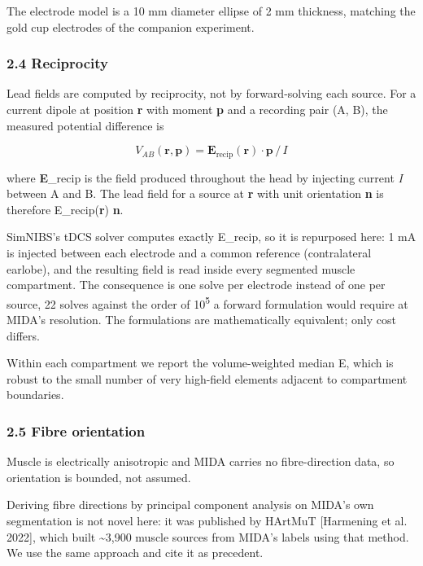 \documentclass[
  11pt,
  a4paper,
]{article}
\begin{document}
The electrode model is a 10 mm diameter ellipse of 2 mm thickness, matching the
gold cup electrodes of the companion experiment.

\subsubsection{2.4 Reciprocity}\label{reciprocity}

Lead fields are computed by reciprocity, not by forward-solving each source. For
a current dipole at position \textbf{r} with moment \textbf{p} and a recording pair (A,
B), the measured potential difference is

\[V_{AB}(\mathbf{r}, \mathbf{p}) = \mathbf{E}_{\mathrm{recip}}(\mathbf{r}) \cdot \mathbf{p} \, / \, I\]

where \textbf{E}\_recip is the field produced throughout the head by injecting current
\emph{I} between A and B. The lead field for a source at \textbf{r} with unit orientation
\textbf{n} is therefore E\_recip(\textbf{r}) \textperiodcentered{} \textbf{n}.

SimNIBS's tDCS solver computes exactly E\_recip, so it is repurposed here: 1 mA
is injected between each electrode and a common reference (contralateral
earlobe), and the resulting field is read inside every segmented muscle
compartment. The consequence is one solve per electrode instead of one per
source, 22 solves against the order of 10\textsuperscript{5} a forward formulation would require
at MIDA's resolution. The formulations are mathematically equivalent; only cost
differs.

Within each compartment we report the volume-weighted median \textbar E\textbar, which is
robust to the small number of very high-field elements adjacent to compartment
boundaries.

\subsubsection{2.5 Fibre orientation}\label{fibre-orientation}

Muscle is electrically anisotropic and MIDA carries no fibre-direction data, so
orientation is bounded, not assumed.

Deriving fibre directions by principal component analysis on MIDA's own
segmentation is not novel here: it was published by HArtMuT {[}Harmening et al.
2022{]}, which built \textasciitilde3,900 muscle sources from MIDA's labels using that method.
We use the same approach and cite it as precedent.
\end{document}
